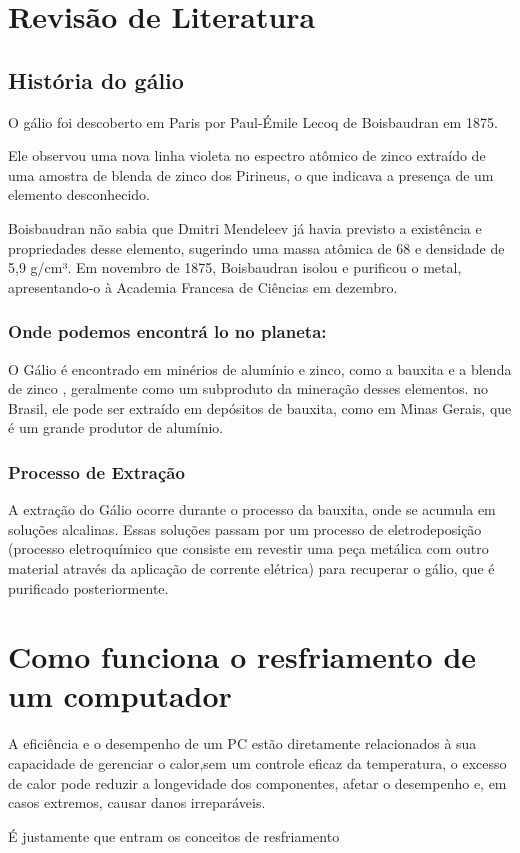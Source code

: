\documentclass[12pt]{article}
\begin{document}
\section{Revisão de Literatura}
\subsection{História do gálio}
O gálio foi descoberto em Paris por Paul-Émile Lecoq de Boisbaudran em 1875. 

Ele observou uma nova linha violeta no espectro atômico de zinco extraído de uma amostra de blenda de zinco  dos Pirineus, o que indicava a presença de um elemento desconhecido.

Boisbaudran não sabia que Dmitri Mendeleev já havia previsto a existência e propriedades desse elemento, sugerindo uma massa atômica de 68 e densidade de 5,9 g/cm³. Em novembro de 1875, Boisbaudran isolou e purificou o metal, apresentando-o à Academia Francesa de Ciências em dezembro.
\subsubsection{Onde podemos encontrá lo no planeta:}
O Gálio é encontrado em minérios de alumínio e zinco, como a bauxita e a blenda de zinco , geralmente como um subproduto da mineração desses elementos. no Brasil, ele pode ser extraído em depósitos de bauxita, como em Minas Gerais, que é um grande produtor de alumínio.
\subsubsection{Processo de Extração}
A extração do Gálio ocorre durante o processo da bauxita, onde se acumula em soluções alcalinas. Essas soluções passam por um processo de eletrodeposição (processo eletroquímico que consiste em revestir uma peça metálica com outro material através da aplicação de corrente elétrica) para recuperar o gálio, que é purificado posteriormente. 
\section{Como funciona o resfriamento de um computador}
A eficiência e o desempenho de um PC estão diretamente relacionados à sua capacidade de gerenciar o calor,sem um controle eficaz da temperatura, o excesso de calor pode reduzir a longevidade dos componentes, afetar o desempenho e, em casos extremos, causar danos irreparáveis. 

É justamente que entram os conceitos de resfriamento
\end{document}
